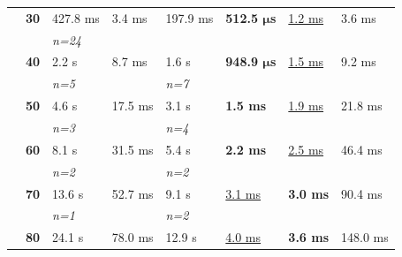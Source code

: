 \documentclass{juliacon}
\begin{document}
\begin{table}
\begin{tabular}{clllllll}
                                & \textbf{30} & 427.8 ms          & 3.4 ms                       & 197.9 ms         & \textbf{512.5 \( \bm{\mu} \)s} & \underline{1.2 ms}           & 3.6 ms                       \\
                                &             & \textit{n=24}     &                              &                  &                                &                              &                              \\
                                & \textbf{40} & 2.2 s             & 8.7 ms                       & 1.6 s            & \textbf{948.9 \( \bm{\mu} \)s} & \underline{1.5 ms}           & 9.2 ms                       \\
                                &             & \textit{n=5}      &                              & \textit{n=7}     &                                &                              &                              \\
                                & \textbf{50} & 4.6 s             & 17.5 ms                      & 3.1 s            & \textbf{1.5 ms}                & \underline{1.9 ms}           & 21.8 ms                      \\
                                &             & \textit{n=3}      &                              & \textit{n=4}     &                                &                              &                              \\
                                & \textbf{60} & 8.1 s             & 31.5 ms                      & 5.4 s            & \textbf{2.2 ms}                & \underline{2.5 ms}           & 46.4 ms                      \\
                                &             & \textit{n=2}      &                              & \textit{n=2}     &                                &                              &                              \\
                                & \textbf{70} & 13.6 s            & 52.7 ms                      & 9.1 s            & \underline{3.1 ms}             & \textbf{3.0 ms}              & 90.4 ms                      \\
                                &             & \textit{n=1}      &                              & \textit{n=2}     &                                &                              &                              \\
                                & \textbf{80} & 24.1 s            & 78.0 ms                      & 12.9 s           & \underline{4.0 ms}             & \textbf{3.6 ms}              & 148.0 ms                     \\

\end{tabular}
\end{table}
\end{document}
